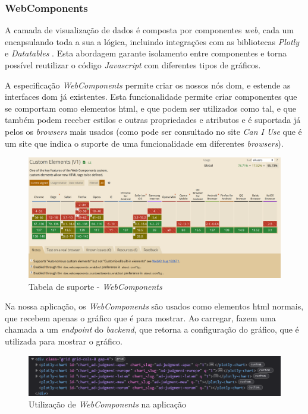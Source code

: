 \subsubsection{WebComponents}

A camada de visualização de dados é composta por componentes \textit{web}, cada um encapsulando toda a sua a lógica, incluindo integrações com as bibliotecas \textit{Plotly} e \textit{Datatables} . Esta abordagem garante isolamento entre componentes e torna possível reutilizar o código \textit{Javascript} com diferentes tipos de gráficos. 

A especificação \textit{WebComponents}\cite{webcomponents} permite criar os nossos nós \gls{dom}, e estende as interfaces \gls{dom} já existentes. Esta funcionalidade permite criar componentes que se comportam como elementos \gls{html}, e que podem ser utilizados como tal, e que também podem receber estilos e outras propriedades e atributos e é suportada já pelos os \textit{browsers} mais usados (como pode ser consultado no site \textit{Can I Use}\cite{caniuse} que é um site que indica o suporte de uma funcionalidade em diferentes \textit{browsers}).

\begin{figure}[H]
    \centering
    \includegraphics[max width=\textwidth]{./img/caniuse}
 \caption{Tabela de suporte - \textit{WebComponents}}
 \end{figure}

Na nossa aplicação, os \textit{WebComponents} são usados como elementos \gls{html} normais, que recebem apenas o gráfico que é para mostrar. Ao carregar, fazem uma chamada a um \textit{endpoint} do \textit{backend}, que retorna a configuração do gráfico, que é utilizada para mostrar o gráfico.

\begin{figure}[H]
    \centering
    \includegraphics[max width=\textwidth]{./img/webc}
 \caption{Utilização de \textit{WebComponents} na aplicação}
 \end{figure}

